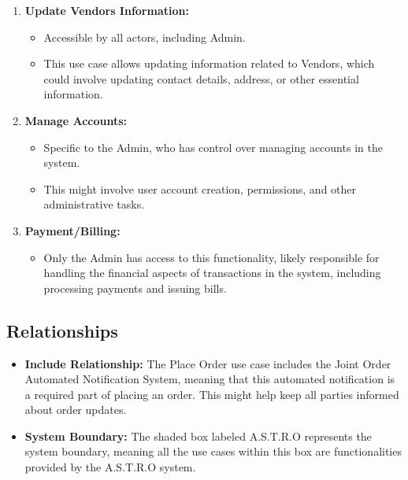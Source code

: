 \begin{enumerate}
    \item \textbf{Update Vendors Information:}
    \begin{itemize}
        \item Accessible by all actors, including Admin.
        \item This use case allows updating information related to Vendors, which could involve updating contact details, address, or other essential information.
    \end{itemize}

    \item \textbf{Manage Accounts:}
    \begin{itemize}
        \item Specific to the Admin, who has control over managing accounts in the system.
        \item This might involve user account creation, permissions, and other administrative tasks.
    \end{itemize}

    \item \textbf{Payment/Billing:}
    \begin{itemize}
        \item Only the Admin has access to this functionality, likely responsible for handling the financial aspects of transactions in the system, including processing payments and issuing bills.
    \end{itemize}
\end{enumerate}
\subsection{Relationships}

\begin{itemize}
    \item \textbf{Include Relationship:}
The Place Order use case includes the Joint Order Automated Notification System, meaning that this automated notification is a required part of placing an order. This might help keep all parties informed about order updates.


    \item \textbf{System Boundary:}
The shaded box labeled A.S.T.R.O represents the system boundary, meaning all the use cases within this box are functionalities provided by the A.S.T.R.O system.

\end{itemize}